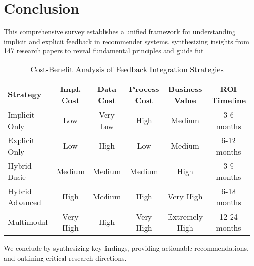 
\section{Conclusion}
\label{sec:conclusion}

This comprehensive survey establishes a unified framework for understanding implicit and explicit feedback in recommender systems, synthesizing insights from 147 research papers to reveal fundamental principles and guide fut\begin{table}[h]
\centering
\caption{Cost-Benefit Analysis of Feedback Integration Strategies}
\label{tab:cost_benefit}
\scriptsize
\begin{tabular}{@{}lccccc@{}}
\toprule
Strategy & Impl. Cost & Data Cost & Process Cost & Business Value & ROI Timeline \\
\midrule
Implicit Only & Low & Very Low & High & Medium & 3-6 months \\
Explicit Only & Low & High & Low & Medium & 6-12 months \\
Hybrid Basic & Medium & Medium & Medium & High & 3-9 months \\
Hybrid Advanced & High & Medium & High & Very High & 6-18 months \\
Multimodal & Very High & High & Very High & Extremely High & 12-24 months \\
\bottomrule
\end{tabular}
\end{table} We conclude by synthesizing key findings, providing actionable recommendations, and outlining critical research directions.

